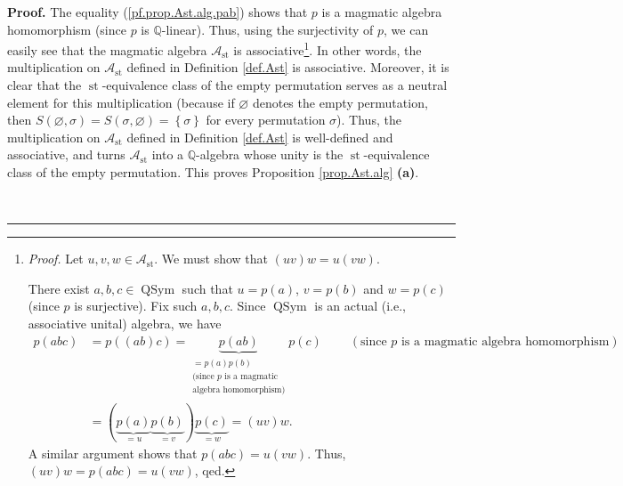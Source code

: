 \documentclass[numbers=enddot,12pt,final,onecolumn,notitlepage]{scrartcl}%
\theoremstyle{definition}
\newenvironment{proof}[1][Proof]{\noindent\textbf{#1.} }{\ \rule{0.5em}{0.5em}}
\begin{document}
\begin{proof}
The equality (\ref{pf.prop.Ast.alg.pab}) shows that $p$ is a magmatic algebra
homomorphism (since $p$ is $\mathbb{Q}$-linear). Thus, using the surjectivity
of $p$, we can easily see that the magmatic algebra $\mathcal{A}%
_{\operatorname*{st}}$ is associative\footnote{\textit{Proof.} Let
$u,v,w\in\mathcal{A}_{\operatorname*{st}}$. We must show that $\left(
uv\right)  w=u\left(  vw\right)  $.
\par
There exist $a,b,c\in\operatorname*{QSym}$ such that $u=p\left(  a\right)  $,
$v=p\left(  b\right)  $ and $w=p\left(  c\right)  $ (since $p$ is surjective).
Fix such $a,b,c$. Since $\operatorname*{QSym}$ is an actual (i.e., associative
unital) algebra, we have%
\begin{align*}
p\left(  abc\right)   &  =p\left(  \left(  ab\right)  c\right)
=\underbrace{p\left(  ab\right)  }_{\substack{=p\left(  a\right)  p\left(
b\right)  \\\text{(since }p\text{ is a magmatic}\\\text{algebra homomorphism)}%
}}p\left(  c\right)  \ \ \ \ \ \ \ \ \ \ \left(  \text{since }p\text{ is a
magmatic algebra homomorphism}\right) \\
&  =\left(  \underbrace{p\left(  a\right)  }_{=u}\underbrace{p\left(
b\right)  }_{=v}\right)  \underbrace{p\left(  c\right)  }_{=w}=\left(
uv\right)  w.
\end{align*}
A similar argument shows that $p\left(  abc\right)  =u\left(  vw\right)  $.
Thus, $\left(  uv\right)  w=p\left(  abc\right)  =u\left(  vw\right)  $,
qed.}. In other words, the multiplication on $\mathcal{A}_{\operatorname*{st}%
}$ defined in Definition \ref{def.Ast} is associative. Moreover, it is clear
that the $\operatorname*{st}$-equivalence class of the empty permutation
serves as a neutral element for this multiplication (because if $\varnothing$
denotes the empty permutation, then $S\left(  \varnothing,\sigma\right)
=S\left(  \sigma,\varnothing\right)  =\left\{  \sigma\right\}  $ for every
permutation $\sigma$). Thus, the multiplication on $\mathcal{A}%
_{\operatorname*{st}}$ defined in Definition \ref{def.Ast} is well-defined and
associative, and turns $\mathcal{A}_{\operatorname*{st}}$ into a $\mathbb{Q}%
$-algebra whose unity is the $\operatorname*{st}$-equivalence class of the
empty permutation. This proves Proposition \ref{prop.Ast.alg} \textbf{(a)}.


\end{proof}
\end{document}
